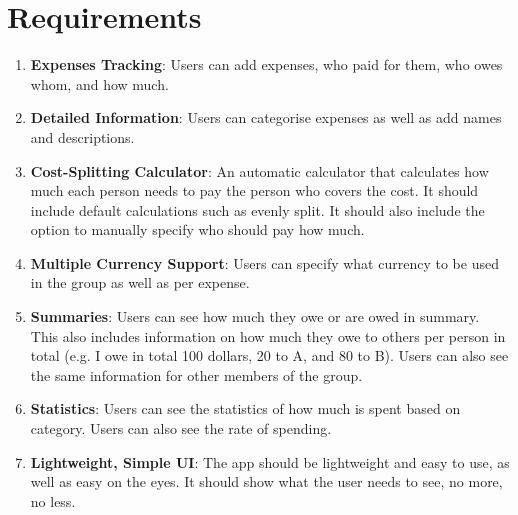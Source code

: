 \documentclass[conference]{IEEEtran}
\begin{document}
\section{Requirements}
\begin{enumerate}
    \item \textbf{Expenses Tracking}: Users can add expenses, who paid for them, who owes whom, and how much.
    \item \textbf{Detailed Information}: Users can categorise expenses as well as add names and descriptions.
    \item \textbf{Cost-Splitting Calculator}: An automatic calculator that calculates how much each person needs to pay the person who covers the cost. It should include default calculations such as evenly split. It should also include the option to manually specify who should pay how much.
    \item \textbf{Multiple Currency Support}: Users can specify what currency to be used in the group as well as per expense.
    \item \textbf{Summaries}: Users can see how much they owe or are owed in summary. This also includes information on how much they owe to others per person in total (e.g. I owe in total 100 dollars, 20 to A, and 80 to B). Users can also see the same information for other members of the group.
    \item \textbf{Statistics}: Users can see the statistics of how much is spent based on category. Users can also see the rate of spending.
    \item \textbf{Lightweight, Simple UI}: The app should be lightweight and easy to use, as well as easy on the eyes. It should show what the user needs to see, no more, no less.
\end{enumerate}
\end{document}
